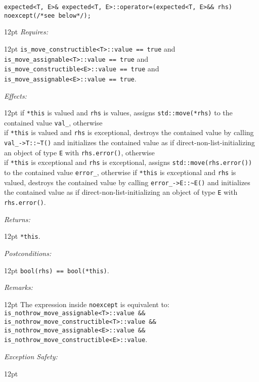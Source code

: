 \documentclass[a4paper,10pt]{article}
\newcommand{\cpp}[1]{\lstinline{#1}}
\newcommand{\wordingItem}[1]{\noindent\textit{#1:}}
\newenvironment{wordingTextItem}[1]{\wordingItem{#1}\vspace{7pt}\noindent\begin{adjustwidth}{12pt}{}}{\vspace{7pt}\end{adjustwidth}}
\newenvironment{wordingPara}{\begin{adjustwidth}{12pt}{}}{\end{adjustwidth}}
\begin{document}
\begin{lstlisting}[xleftmargin=0pt]
expected<T, E>& expected<T, E>::operator=(expected<T, E>&& rhs) noexcept(/*see below*/); 
\end{lstlisting}
\begin{wordingPara}
\begin{wordingTextItem}{Requires}
\cpp{is_move_constructible<T>::value == true} and \\
\cpp{is_move_assignable<T>::value == true} and \\
\cpp{is_move_constructible<E>::value == true} and
\cpp{is_move_assignable<E>::value == true}.
\end{wordingTextItem}
\begin{wordingTextItem}{Effects}
if \cpp{*this} is valued and \cpp{rhs} is values, assigns \cpp{std::move(*rhs)} to the contained value \cpp{val_}, otherwise \\
if \cpp{*this} is valued and \cpp{rhs} is exceptional, destroys the contained value by calling \cpp{val_->T::~T()} and  initializes the contained value as if direct-non-list-initializing an object of type \cpp{E} with \cpp{rhs.error()}, otherwise \\
if \cpp{*this} is exceptional and \cpp{rhs} is exceptional, assigns \cpp{std::move(rhs.error())} to the contained value \cpp{error_}, otherwise  
if \cpp{*this} is exceptional and \cpp{rhs} is valued, destroys the contained value by calling \cpp{error_->E::~E()} and  initializes the contained value as if direct-non-list-initializing an object of type \cpp{E} with \cpp{rhs.error()}.
\end{wordingTextItem}
\begin{wordingTextItem}{Returns}
\cpp{*this}.
\end{wordingTextItem}
\begin{wordingTextItem}{Postconditions}
\cpp{bool(rhs) == bool(*this)}.
\end{wordingTextItem}
\begin{wordingTextItem}{Remarks}
The expression inside \cpp{noexcept} is equivalent to:\\
\cpp{is_nothrow_move_assignable<T>::value &&}\\
\cpp{is_nothrow_move_constructible<T>::value &&}\\
\cpp{is_nothrow_move_assignable<E>::value &&}\\
\cpp{is_nothrow_move_constructible<E>::value}.
\end{wordingTextItem}
\begin{wordingTextItem}{Exception Safety}

\end{wordingTextItem}
\end{wordingPara}
\end{document}
